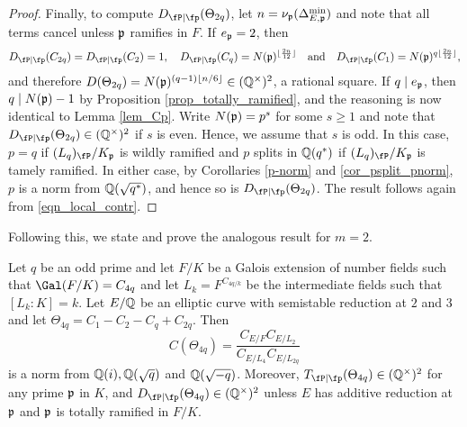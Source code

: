 \begin{proof}
    Finally, to compute $\Dp(\Theta_{2q})$, let $n=\nu_{\mathfrak{p}}(\Delta_{E,\mathfrak{p}}^{\min})$ and note that all terms cancel unless $\mathfrak{p}$ ramifies in $F$. If $e_{\mathfrak{p}}=2$, then
    \begin{equation}\label{eqn_ep=2}
        \Dp(C_{2q})=\Dp(C_2)=1,\quad \Dp(C_q)=N(\pp)^{\floor{\frac{2n}{12}}}\quad\text{and}\quad \Dp(C_1)=N(\pp)^{q\floor{\frac{2n}{12}}},
    \end{equation}
    and therefore $D(\Theta_{2q})=N(\mathfrak{p})^{(q-1)\lfloor n/6\rfloor}\in(\mathbb{Q}^{\times})^2$, a rational square. If $q\mid e_{\mathfrak{p}}$, then $q\mid N(\mathfrak{p})-1$ by Proposition \ref{prop_totally_ramified}, and the reasoning is now identical to Lemma \ref{lem_Cp}. Write $N(\mathfrak{p})=p^s$ for some $s\geq1$ and note that $\Dp(\Theta_{2q})\in\QQss$ if $s$ is even. Hence, we assume that $s$ is odd. In this case, $p=q$ if $(L_q)_\fP/K_\pp$ is wildly ramified and $p$ splits in $\mathbb{Q}(q^*)$ if $(L_q)_\fP/K_\pp$ is tamely ramified. In either case, by Corollaries \ref{p-norm} and \ref{cor_psplit_pnorm}, $p$ is a norm from $\mathbb{Q}(\sqrt{q^*})$, and hence so is $\Dp(\Theta_{2q})$.
    The result follows again from \eqref{eqn_local_contr}.

\end{proof}

Following this, we state and prove the analogous result for $m=2$.

\begin{lemma}\label{lem_C4p}
    Let $q$ be an odd prime and let $F/K$ be a Galois extension of number fields such that $\Gal(F/K)=C_{4q}$ and let $L_k=F^{C_{4q/k}}$ be the intermediate fields such that $[L_k:K]=k$. Let $E/\mathbb{Q}$ be an elliptic curve with semistable reduction at $2$ and $3$ and let $\Theta_{4q}=C_1-C_2-C_q+C_{2q}$. Then 
    $$C(\Theta_{4q})=\frac{C_{E/F}C_{E/L_2}}{C_{E/L_4}C_{E/L_{2q}}}$$
    is a norm from $\mathbb{Q}(i),\mathbb{Q}(\sqrt{q})$ and $\mathbb{Q}(\sqrt{-q})$. Moreover, $\Tp(\Theta_{4q})\in\QQss$ for any prime $\mathfrak{p}$ in $K$, and $\Dp(\Theta_{4q})\in\QQss$ unless $E$ has additive reduction at $\mathfrak{p}$ and $\mathfrak{p}$ is totally ramified in $F/K$.
\end{lemma}

